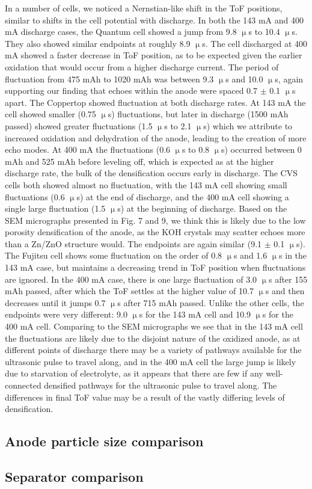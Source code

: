 In a number of cells, we noticed a Nernstian-like shift in the ToF positions, similar to shifts in the cell potential with discharge. In both the 143 mA and 400 mA discharge cases, the Quantum cell showed a jump from 9.8 $\upmu$s to 10.4 $\upmu$s. They also showed similar endpoints at roughly 8.9 $\upmu$s. The cell discharged at 400 mA showed a faster decrease in ToF position, as to be expected given the earlier oxidation that would occur from a higher discharge current. The period of fluctuation from 475 mAh to 1020 mAh was between 9.3 $\upmu$s and 10.0 $\upmu$s, again supporting our finding that echoes within the anode were spaced 0.7 $\pm$ 0.1 $\upmu$s apart. The Coppertop showed fluctuation at both discharge rates. At 143 mA the cell showed smaller (0.75 $\upmu$s) fluctuations, but later in discharge (1500 mAh passed) showed greater fluctuations (1.5 $\upmu$s to 2.1 $\upmu$s) which we attribute to increased oxidation and dehydration of the anode, leading to the creation of more echo modes. At 400 mA the fluctuations (0.6 $\upmu$s to 0.8 $\upmu$s) occurred between 0 mAh and 525 mAh before leveling off, which is expected as at the higher discharge rate, the bulk of the densification occurs early in discharge. The CVS cells both showed almost no fluctuation, with the 143 mA cell showing small fluctuations (0.6 $\upmu$s) at the end of discharge, and the 400 mA cell showing a single large fluctuation (1.5 $\upmu$s) at the beginning of discharge. Based on the SEM micrographs presented in Fig. 7 and 9, we think this is likely due to the low porosity densification of the anode, as the KOH crystals may scatter echoes more than a Zn/ZnO structure would. The endpoints are again similar (9.1 $\pm$ 0.1 $\upmu$s). The Fujitsu cell shows some fluctuation on the order of 0.8 $\upmu$s and 1.6 $\upmu$s in the 143 mA case, but maintains a decreasing trend in ToF position when fluctuations are ignored. In the 400 mA case, there is one large fluctuation of 3.0 $\upmu$s after 155 mAh passed, after which the ToF settles at the higher value of 10.7 $\upmu$s and then decreases until it jumps 0.7 $\upmu$s after 715 mAh passed. Unlike the other cells, the endpoints were very different: 9.0 $\upmu$s for the 143 mA cell and 10.9 $\upmu$s for the 400 mA cell. Comparing to the SEM micrographs we see that in the 143 mA cell the fluctuations are likely due to the disjoint nature of the oxidized anode, as at different points of discharge there may be a variety of pathways available for the ultrasonic pulse to travel along, and in the 400 mA cell the large jump is likely due to starvation of electrolyte, as it appears that there are few if any well-connected densified pathways for the ultrasonic pulse to travel along. The differences in final ToF value may be a result of the vastly differing levels of densification.

\subsection{Anode particle size comparison}
\subsection{Separator comparison}
